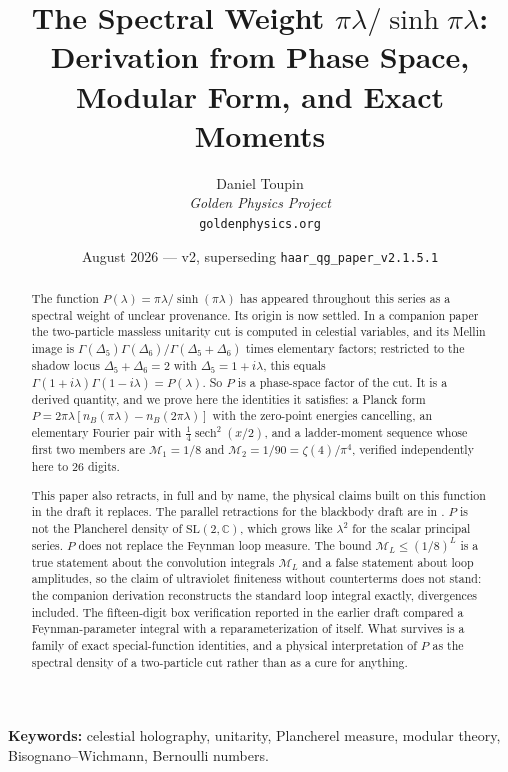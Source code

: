\documentclass[12pt,a4paper]{article}
\title{The Spectral Weight $\pi\lambda/\sinh\pi\lambda$:\\[4pt]
Derivation from Phase Space, Modular Form, and Exact Moments}
\author{Daniel Toupin\\[4pt]
\textit{Golden Physics Project}\\[2pt]
\texttt{goldenphysics.org}}
\date{August 2026 --- v2, superseding \texttt{haar\_qg\_paper\_v2.1.5.1}
}
\theoremstyle{plain}
\theoremstyle{definition}
\theoremstyle{remark}
\newcommand{\C}{\mathbb{C}}
\newcommand{\cM}{\mathcal{M}}
\begin{document}
\maketitle

\begin{abstract}
\noindent
The function $P(\lambda)=\pi\lambda/\sinh(\pi\lambda)$ has appeared
throughout this series as a spectral weight of unclear provenance. Its
origin is now settled. In a companion paper the two-particle massless
unitarity cut is computed in celestial variables, and its Mellin image
is $\Gamma(\Delta_5)\Gamma(\Delta_6)/\Gamma(\Delta_5+\Delta_6)$ times
elementary factors; restricted to the shadow locus
$\Delta_5+\Delta_6=2$ with $\Delta_5=1+i\lambda$, this equals
$\Gamma(1+i\lambda)\Gamma(1-i\lambda)=P(\lambda)$. So $P$ is a
phase-space factor of the cut. It is a derived quantity, and we prove
here the identities it satisfies: a Planck form
$P=2\pi\lambda[n_B(\pi\lambda)-n_B(2\pi\lambda)]$ with the zero-point
energies cancelling, an elementary Fourier pair with
$\tfrac14\operatorname{sech}^2(x/2)$, and a ladder-moment sequence whose
first two members are $\cM_1=1/8$ and $\cM_2=1/90=\zeta(4)/\pi^4$,
verified independently here to 26 digits.

This paper also retracts, in full and by name, the physical claims
built on this function in the draft it replaces. The parallel
retractions for the blackbody draft are in \cite{ToupinModular}. $P$ is not the
Plancherel density of $\mathrm{SL}(2,\C)$, which grows like $\lambda^2$
for the scalar principal series. $P$ does not replace the Feynman loop
measure. The bound $\cM_L\le(1/8)^L$ is a true statement about the
convolution integrals $\cM_L$ and a false statement about loop
amplitudes, so the claim of ultraviolet finiteness without
counterterms does not stand: the companion derivation reconstructs the
standard loop integral exactly, divergences included. The fifteen-digit
box verification reported in the earlier draft compared a
Feynman-parameter integral with a reparameterization of itself. What
survives is a family of exact special-function identities, and a
physical interpretation of $P$ as the spectral density of a
two-particle cut rather than as a cure for anything.
\end{abstract}

\medskip
\noindent\textbf{Keywords:} celestial holography, unitarity, Plancherel
measure, modular theory, Bisognano--Wichmann, Bernoulli numbers.

\tableofcontents
\newpage
\end{document}
